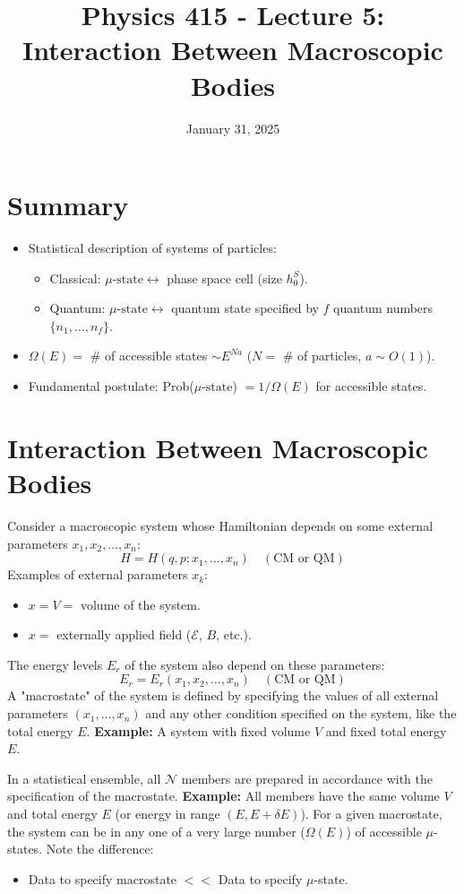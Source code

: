 \documentclass[11pt]{article}
\title{Physics 415 - Lecture 5: Interaction Between Macroscopic Bodies}
\date{January 31, 2025}
\author{} %
\newcommand{\muState}{\mu\text{-state}} %
\newcommand{\OmegaE}{\Omega(E)}
\newcommand{\deltaE}{\delta E}
\begin{document}
\maketitle
\thispagestyle{empty}

\section*{Summary}

\begin{itemize}
    \item Statistical description of systems of particles:
    \begin{itemize}
        \item Classical: $\muState \leftrightarrow$ phase space cell (size $h_0^S$).
        \item Quantum: $\muState \leftrightarrow$ quantum state specified by $f$ quantum numbers $\{n_1, \dots, n_f\}$.
    \end{itemize}
    \item $\OmegaE = $ \# of accessible states $\sim E^{Na}$ ($N=$ \# of particles, $a \sim O(1)$).
    \item Fundamental postulate: Prob($\muState$) $= 1/\OmegaE$ for accessible states.
\end{itemize}

\section*{Interaction Between Macroscopic Bodies}

Consider a macroscopic system whose Hamiltonian depends on some external parameters $x_1, x_2, \dots, x_n$:
\[ H = H(q, p; x_1, \dots, x_n) \quad (\text{CM or QM}) \]
Examples of external parameters $x_k$:
\begin{itemize}
    \item $x = V =$ volume of the system.
    \item $x =$ externally applied field ($\mathcal{E}$, $B$, etc.).
\end{itemize}
The energy levels $E_r$ of the system also depend on these parameters:
\[ E_r = E_r(x_1, x_2, \dots, x_n) \quad (\text{CM or QM}) \]
A "macrostate" of the system is defined by specifying the values of all external parameters $(x_1, \dots, x_n)$ and any other condition specified on the system, like the total energy $E$.
\textbf{Example:} A system with fixed volume $V$ and fixed total energy $E$.

In a statistical ensemble, all $\mathcal{N}$ members are prepared in accordance with the specification of the macrostate.
\textbf{Example:} All members have the same volume $V$ and total energy $E$ (or energy in range $(E, E+\deltaE)$).
For a given macrostate, the system can be in any one of a very large number ($\OmegaE$) of accessible $\mu$-states.
Note the difference:
\begin{itemize}
    \item Data to specify macrostate $<<$ Data to specify $\mu$-state.
\end{itemize}
\end{document}
